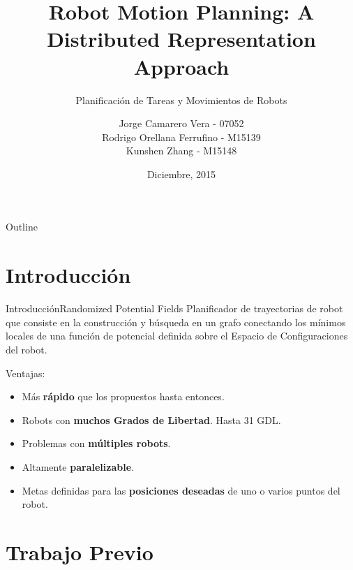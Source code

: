 \documentclass{beamer}
\title{Robot Motion Planning: A Distributed Representation Approach}
\subtitle{Planificación de Tareas y Movimientos de Robots}
\author{Jorge Camarero Vera - 07052\\ Rodrigo Orellana Ferrufino - M15139\\ Kunshen Zhang - M15148}
\institute[] %
{
  Máster en Automática y Robótica\\
  Universidad Politécnica de Madrid
}
\date{Diciembre, 2015}
\begin{document}
\begin{frame}
  \titlepage
\end{frame}

\begin{frame}{Outline}
  \tableofcontents
\end{frame}



\section{Introducción}
%

\begin{frame}{Introducción}{Randomized Potential Fields}
		Planificador de trayectorias de robot que consiste en
		la construcción y búsqueda en un grafo conectando los mínimos locales de una función de potencial
		definida sobre el Espacio de Configuraciones del robot.\\
		
		\bigskip
		
		Ventajas:
		\begin{itemize}
			\item Más \textbf{rápido} que los propuestos hasta entonces.
			\item Robots con \textbf{muchos Grados de Libertad}. Hasta 31 GDL.
			\item Problemas con \textbf{múltiples robots}.
			\item Altamente \textbf{paralelizable}.
			\item Metas definidas para las \textbf{posiciones deseadas} de uno o varios puntos del robot.
		\end{itemize}
\end{frame}

\section{Trabajo Previo}
\end{document}

